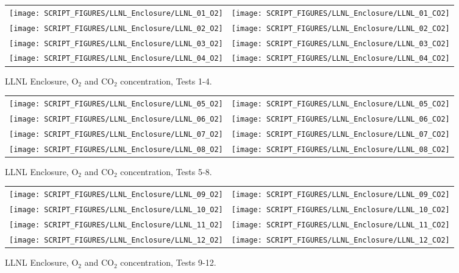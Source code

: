 \begin{figure}[p]
\begin{tabular*}{\textwidth}{l@{\extracolsep{\fill}}r}
\texttt{[image: SCRIPT\_FIGURES/LLNL\_Enclosure/LLNL\_01\_O2]} &
\texttt{[image: SCRIPT\_FIGURES/LLNL\_Enclosure/LLNL\_01\_CO2]} \\
\texttt{[image: SCRIPT\_FIGURES/LLNL\_Enclosure/LLNL\_02\_O2]} &
\texttt{[image: SCRIPT\_FIGURES/LLNL\_Enclosure/LLNL\_02\_CO2]} \\
\texttt{[image: SCRIPT\_FIGURES/LLNL\_Enclosure/LLNL\_03\_O2]} &
\texttt{[image: SCRIPT\_FIGURES/LLNL\_Enclosure/LLNL\_03\_CO2]} \\
\texttt{[image: SCRIPT\_FIGURES/LLNL\_Enclosure/LLNL\_04\_O2]} &
\texttt{[image: SCRIPT\_FIGURES/LLNL\_Enclosure/LLNL\_04\_CO2]}
\end{tabular*}
\caption{LLNL Enclosure, O$_2$ and CO$_2$ concentration, Tests 1-4.}
\label{LLNL_Gas_1}
\end{figure}

\begin{figure}[p]
\begin{tabular*}{\textwidth}{l@{\extracolsep{\fill}}r}
\texttt{[image: SCRIPT\_FIGURES/LLNL\_Enclosure/LLNL\_05\_O2]} &
\texttt{[image: SCRIPT\_FIGURES/LLNL\_Enclosure/LLNL\_05\_CO2]} \\
\texttt{[image: SCRIPT\_FIGURES/LLNL\_Enclosure/LLNL\_06\_O2]} &
\texttt{[image: SCRIPT\_FIGURES/LLNL\_Enclosure/LLNL\_06\_CO2]} \\
\texttt{[image: SCRIPT\_FIGURES/LLNL\_Enclosure/LLNL\_07\_O2]} &
\texttt{[image: SCRIPT\_FIGURES/LLNL\_Enclosure/LLNL\_07\_CO2]} \\
\texttt{[image: SCRIPT\_FIGURES/LLNL\_Enclosure/LLNL\_08\_O2]} &
\texttt{[image: SCRIPT\_FIGURES/LLNL\_Enclosure/LLNL\_08\_CO2]}
\end{tabular*}
\caption{LLNL Enclosure, O$_2$ and CO$_2$ concentration, Tests 5-8.}
\label{LLNL_Gas_2}
\end{figure}

\begin{figure}[p]
\begin{tabular*}{\textwidth}{l@{\extracolsep{\fill}}r}
\texttt{[image: SCRIPT\_FIGURES/LLNL\_Enclosure/LLNL\_09\_O2]} &
\texttt{[image: SCRIPT\_FIGURES/LLNL\_Enclosure/LLNL\_09\_CO2]} \\
\texttt{[image: SCRIPT\_FIGURES/LLNL\_Enclosure/LLNL\_10\_O2]} &
\texttt{[image: SCRIPT\_FIGURES/LLNL\_Enclosure/LLNL\_10\_CO2]} \\
\texttt{[image: SCRIPT\_FIGURES/LLNL\_Enclosure/LLNL\_11\_O2]} &
\texttt{[image: SCRIPT\_FIGURES/LLNL\_Enclosure/LLNL\_11\_CO2]} \\
\texttt{[image: SCRIPT\_FIGURES/LLNL\_Enclosure/LLNL\_12\_O2]} &
\texttt{[image: SCRIPT\_FIGURES/LLNL\_Enclosure/LLNL\_12\_CO2]}
\end{tabular*}
\caption{LLNL Enclosure, O$_2$ and CO$_2$ concentration, Tests 9-12.}
\label{LLNL_Gas_3}
\end{figure}


